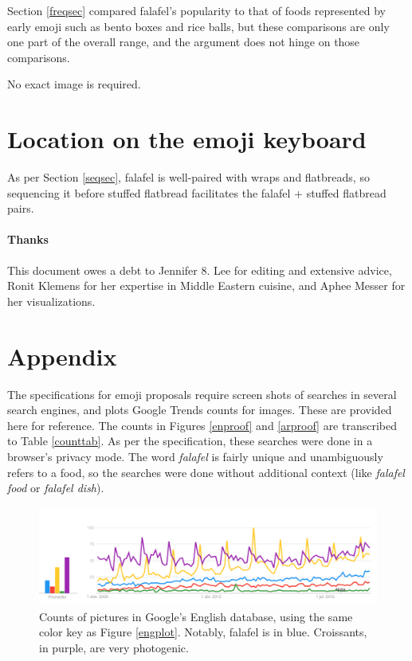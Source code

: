 \documentclass[a4paper,10pt]{article}
\begin{document}
Section \ref{freqsec} compared falafel's popularity to that of foods represented by early
emoji such as bento boxes and rice balls, but these comparisons are only one part of the
overall range, and the argument does not hinge on those comparisons.

No exact image is required.

\section{Location on the emoji keyboard}

As per Section \ref{seqsec}, falafel is well-paired with wraps and flatbreads, so 
sequencing it before {\sc stuffed flatbread}
facilitates the {\sc falafel} + {\sc stuffed flatbread} pairs.

\vfill
{\small \paragraph{Thanks} This document owes a debt to Jennifer 8. Lee for editing and extensive
advice, Ronit Klemens for her expertise in Middle Eastern cuisine,
and Aphee Messer for her visualizations.}

\eject
\section*{Appendix}
The specifications for emoji proposals require screen shots of searches in several
search engines, and plots Google Trends counts for images. These are provided here
for reference. The counts in Figures \ref{enproof} and \ref{arproof} are transcribed
to Table \ref{counttab}. As per the specification, these searches were done
in a browser's privacy mode. The word {\em falafel} is fairly unique and unambiguously
refers to a food, so the searches were done without additional context (like {\em
falafel food} or {\em falafel dish}).


\begin{figure}[!hb]
\begin{center}
\includegraphics[width=4.8in]{etrends-pics.png}
\end{center}
\caption{Counts of pictures in Google's English database, using the same color key as
Figure \ref{engplot}. Notably, falafel is in blue. Croissants, in purple, are very photogenic.}
\label{engpicplot}
\end{figure}
\end{document}
